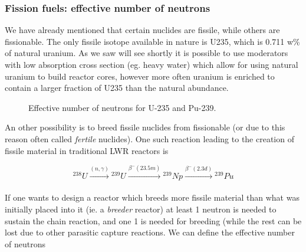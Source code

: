 \subsubsection*{Fission fuels: effective number of neutrons}

We have already mentioned that certain nuclides are fissile, while others are fissionable. The only fissile isotope available in nature is U235, which is 0.711 w\% of natural uranium. As we saw will see shortly it is possible to use moderators with low absorption cross section (eg. heavy water) which allow for using natural uranium to build reactor cores, however more often uranium is enriched to contain a larger fraction of U235 than the natural abundance.

\begin{figure}[ht!]
\protect {}\protect
\caption{\label{fig:eta} \footnotesize{Effective number of neutrons for U-235 and Pu-239.}}
\end{figure}

An other possibility is to breed fissile nuclides from fissionable (or due to this reason often called \textit{fertile} nuclides). One such reaction leading to the creation of fissile material in traditional LWR reactors is

\begin{equation}
{}^{238}U\xrightarrow[]{(n,\gamma)}{}^{239}U\xrightarrow[]{\beta^-(23.5m)}{}^{239}Np\xrightarrow[]{\beta^-(2.3d)} {}^{239}Pu
\end{equation}

If one wants to design a reactor which breeds more fissile material than what was initially placed into it (ie. a \textit{breeder} reactor) at least 1 neutron is needed to sustain the chain reaction, and one 1 is needed for breeding (while the rest can be lost due to other parasitic capture reactions. We can define the effective number of neutrons

